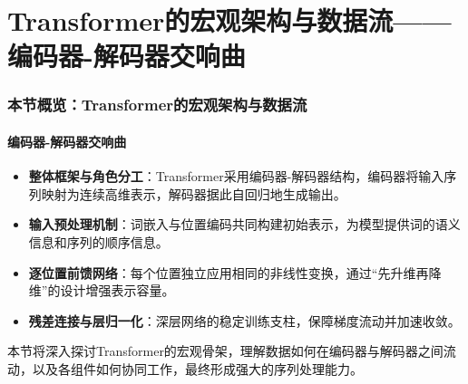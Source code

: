 \documentclass[11pt]{beamer}
\begin{document}
\section{Transformer的宏观架构与数据流——编码器-解码器交响曲}

\begin{frame}
\frametitle{本节概览：Transformer的宏观架构与数据流}
\framesubtitle{编码器-解码器交响曲}

\begin{itemize}
    \item \textbf{整体框架与角色分工}：Transformer采用编码器-解码器结构，编码器将输入序列映射为连续高维表示，解码器据此自回归地生成输出。
    \item \textbf{输入预处理机制}：词嵌入与位置编码共同构建初始表示，为模型提供词的语义信息和序列的顺序信息。
    \item \textbf{逐位置前馈网络}：每个位置独立应用相同的非线性变换，通过“先升维再降维”的设计增强表示容量。
    \item \textbf{残差连接与层归一化}：深层网络的稳定训练支柱，保障梯度流动并加速收敛。
\end{itemize}

\bigskip
本节将深入探讨Transformer的宏观骨架，理解数据如何在编码器与解码器之间流动，以及各组件如何协同工作，最终形成强大的序列处理能力。
\end{frame}
\end{document}
